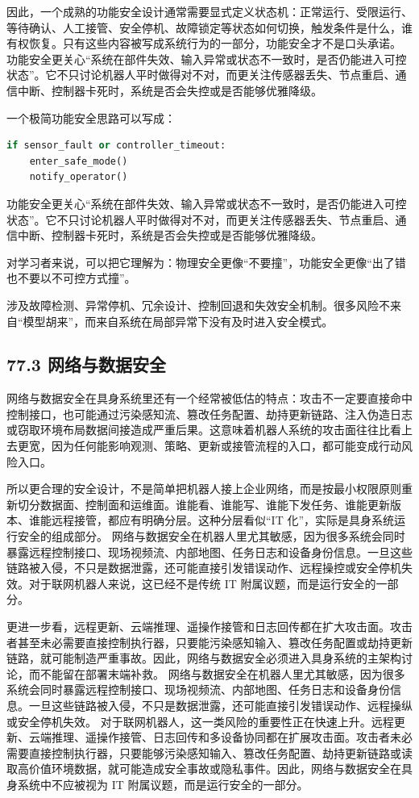 因此，一个成熟的功能安全设计通常需要显式定义状态机：正常运行、受限运行、等待确认、人工接管、安全停机、故障锁定等状态如何切换，触发条件是什么，谁有权恢复。只有这些内容被写成系统行为的一部分，功能安全才不是口头承诺。 功能安全更关心“系统在部件失效、输入异常或状态不一致时，是否仍能进入可控状态”。它不只讨论机器人平时做得对不对，而更关注传感器丢失、节点重启、通信中断、控制器卡死时，系统是否会失控或是否能够优雅降级。

一个极简功能安全思路可以写成：

\begin{lstlisting}[language=python]
if sensor_fault or controller_timeout:
    enter_safe_mode()
    notify_operator()
\end{lstlisting}

功能安全更关心“系统在部件失效、输入异常或状态不一致时，是否仍能进入可控状态”。它不只讨论机器人平时做得对不对，而更关注传感器丢失、节点重启、通信中断、控制器卡死时，系统是否会失控或是否能够优雅降级。

对学习者来说，可以把它理解为：物理安全更像“不要撞”，功能安全更像“出了错也不要以不可控方式撞”。

涉及故障检测、异常停机、冗余设计、控制回退和失效安全机制。很多风险不来自“模型胡来”，而来自系统在局部异常下没有及时进入安全模式。

\subsection*{77.3 网络与数据安全}


网络与数据安全在具身系统里还有一个经常被低估的特点：攻击不一定要直接命中控制接口，也可能通过污染感知流、篡改任务配置、劫持更新链路、注入伪造日志或窃取环境布局数据间接造成严重后果。这意味着机器人系统的攻击面往往比看上去更宽，因为任何能影响观测、策略、更新或接管流程的入口，都可能变成行动风险入口。

所以更合理的安全设计，不是简单把机器人接上企业网络，而是按最小权限原则重新切分数据面、控制面和运维面。谁能看、谁能写、谁能下发任务、谁能更新版本、谁能远程接管，都应有明确分层。这种分层看似“IT 化”，实际是具身系统运行安全的组成部分。 网络与数据安全在机器人里尤其敏感，因为很多系统会同时暴露远程控制接口、现场视频流、内部地图、任务日志和设备身份信息。一旦这些链路被入侵，不只是数据泄露，还可能直接引发错误动作、远程操控或安全停机失效。对于联网机器人来说，这已经不是传统 IT 附属议题，而是运行安全的一部分。

更进一步看，远程更新、云端推理、遥操作接管和日志回传都在扩大攻击面。攻击者甚至未必需要直接控制执行器，只要能污染感知输入、篡改任务配置或劫持更新链路，就可能制造严重事故。因此，网络与数据安全必须进入具身系统的主架构讨论，而不能留在部署末端补救。 网络与数据安全在机器人里尤其敏感，因为很多系统会同时暴露远程控制接口、现场视频流、内部地图、任务日志和设备身份信息。一旦这些链路被入侵，不只是数据泄露，还可能直接引发错误动作、远程操纵或安全停机失效。 对于联网机器人，这一类风险的重要性正在快速上升。远程更新、云端推理、遥操作接管、日志回传和多设备协同都在扩展攻击面。攻击者未必需要直接控制执行器，只要能够污染感知输入、篡改任务配置、劫持更新链路或读取高价值环境数据，就可能造成安全事故或隐私事件。因此，网络与数据安全在具身系统中不应被视为 IT 附属议题，而是运行安全的一部分。

